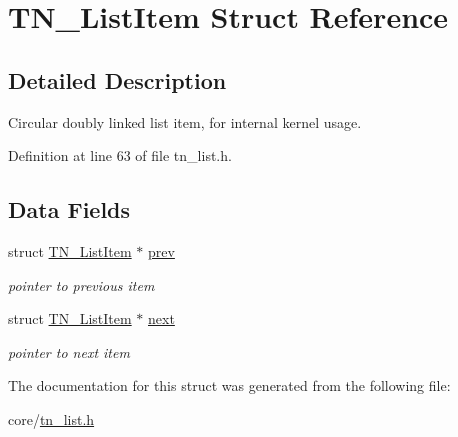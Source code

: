 \hypertarget{structTN__ListItem}{}\section{T\+N\+\_\+\+List\+Item Struct Reference}
\label{structTN__ListItem}


\subsection{Detailed Description}
Circular doubly linked list item, for internal kernel usage. 

Definition at line 63 of file tn\+\_\+list.\+h.

\subsection*{Data Fields}
\begin{DoxyCompactItemize}
\item 
\mbox{\label{structTN__ListItem_a0c53c087a1523596cd81cd25d1aae7d8}} 
struct \hyperlink{structTN__ListItem}{T\+N\+\_\+\+List\+Item} $\ast$ \hyperlink{structTN__ListItem_a0c53c087a1523596cd81cd25d1aae7d8}{prev}
\begin{DoxyCompactList}\small\item\em pointer to previous item \end{DoxyCompactList}\item 
\mbox{\label{structTN__ListItem_a66648d1a9069530836c3fd738b03ab96}} 
struct \hyperlink{structTN__ListItem}{T\+N\+\_\+\+List\+Item} $\ast$ \hyperlink{structTN__ListItem_a66648d1a9069530836c3fd738b03ab96}{next}
\begin{DoxyCompactList}\small\item\em pointer to next item \end{DoxyCompactList}\end{DoxyCompactItemize}


The documentation for this struct was generated from the following file\+:\begin{DoxyCompactItemize}
\item 
core/\hyperlink{tn__list_8h}{tn\+\_\+list.\+h}\end{DoxyCompactItemize}
